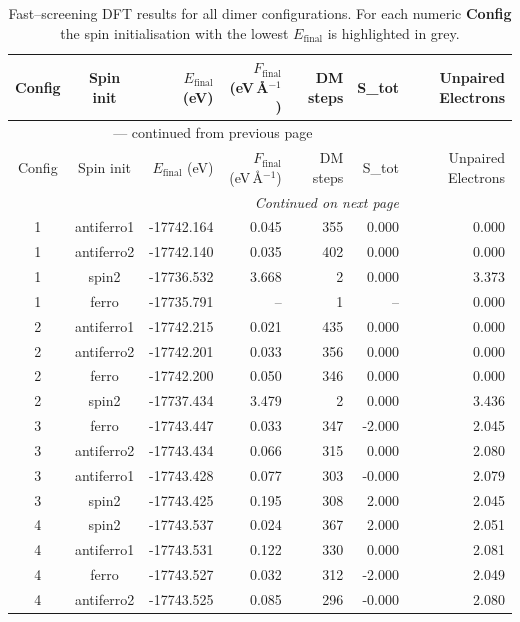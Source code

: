
\begin{longtable}{@{}ccrrrrr@{}}
\caption{Fast–screening DFT results for all dimer configurations.
         For each numeric \textbf{Config} the spin initialisation with the
         lowest $E_{\mathrm{final}}$ is highlighted in grey.}\label{tab:dimer_full}\\
\toprule
Config & Spin init & $E_{\mathrm{final}}$ (eV) &
$F_{\mathrm{final}}$ (eV\,\AA$^{-1}$) & DM steps & S_{tot} & Unpaired Electrons\\
\midrule
\endfirsthead
\multicolumn{6}{c}{{\tablename}~\thetable{} — continued from previous page}\\
\toprule
Config & Spin init & $E_{\mathrm{final}}$ (eV) &
$F_{\mathrm{final}}$ (eV\,\AA$^{-1}$) & DM steps & S_{tot} & Unpaired Electrons\\
\midrule
\endhead
\midrule
\multicolumn{6}{r}{\emph{Continued on next page}}\\
\endfoot
\bottomrule
\endlastfoot
\rowcolor{gray!20} 1 & antiferro1 & -17742.164 & 0.045 & 355 & 0.000 & 0.000 \\
1 & antiferro2 & -17742.140 & 0.035 & 402 & 0.000 & 0.000 \\
1 & spin2 & -17736.532 & 3.668 & 2 & 0.000 & 3.373 \\
1 & ferro & -17735.791 & -- & 1 & -- & 0.000 \\
\rowcolor{gray!20} 2 & antiferro1 & -17742.215 & 0.021 & 435 & 0.000 & 0.000 \\
2 & antiferro2 & -17742.201 & 0.033 & 356 & 0.000 & 0.000 \\
2 & ferro & -17742.200 & 0.050 & 346 & 0.000 & 0.000 \\
2 & spin2 & -17737.434 & 3.479 & 2 & 0.000 & 3.436 \\
\rowcolor{gray!20} 3 & ferro & -17743.447 & 0.033 & 347 & -2.000 & 2.045 \\
3 & antiferro2 & -17743.434 & 0.066 & 315 & 0.000 & 2.080 \\
3 & antiferro1 & -17743.428 & 0.077 & 303 & -0.000 & 2.079 \\
3 & spin2 & -17743.425 & 0.195 & 308 & 2.000 & 2.045 \\
\rowcolor{gray!20} 4 & spin2 & -17743.537 & 0.024 & 367 & 2.000 & 2.051 \\
4 & antiferro1 & -17743.531 & 0.122 & 330 & 0.000 & 2.081 \\
4 & ferro & -17743.527 & 0.032 & 312 & -2.000 & 2.049 \\
4 & antiferro2 & -17743.525 & 0.085 & 296 & -0.000 & 2.080 \\

\end{longtable}
